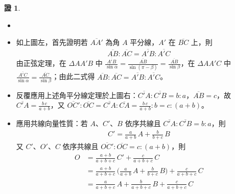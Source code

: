 \documentclass[14pt]{extarticle}
\newcommand{\ds}{\displaystyle}
\theoremstyle{definition}
\newtheorem*{prf}{證}
\begin{document}
\begin{prf}
  \begin{itemize}
    \item[]
    \item 如上圖左，首先證明若 $\ds\overline{AA'}$ 為角 $A$ 平分線，$A'$ 在 $\overline{BC}$ 上，則
      \begin{align*}
        \overline{AB}:\overline{AC} = \overline{A'B}:\overline{A'C}
      \end{align*}
      由正弦定理，在 $\Delta AA'B$ 中 $\ds\frac{\overline{A'B}}{\sin\alpha} = \frac{\overline{AB}}{\sin(\pi - \beta)} = \frac{\overline{AB}}{\sin\beta}$，在 $\Delta AA'C$ 中 $\ds\frac{\overline{A'C}}{\sin\alpha} = \frac{\overline{AC}}{\sin\beta}$；由此二式得 $\overline{AB}:\overline{AC} = \overline{A'B}:\overline{A'C}$。
    \item 反覆應用上述角平分線定理於上圖右：$\ds\overline{C'A}:\overline{C'B} = b:a$，$\ds\overline{AB} = c$，故 $\ds\overline{C'A} = \frac{b\,c}{a + b}$，又 $\ds\overline{OC'}:\overline{OC} = \overline{C'A}:\overline{CA} = \frac{b\,c}{a + b}:b = c:(a + b)$。
    \item 應用共線向量性質：若 $A$、$C'$、$B$ 依序共線且 $\overline{C'A}:\overline{C'B} = b:a$，則
      \begin{align*}
        C' = \frac{a}{a + b}\,A + \frac{b}{b + c}\,B
      \end{align*}
      又 $C'$、$O'$、$C$ 依序共線且 $\overline{OC'}:\overline{OC} = c:(a + b)$，則
      \begin{align*}
        O &= \frac{a + b}{a + b + c}\,C' + \frac{c}{a + b + c}\,C \\ 
          &= \frac{a + b}{a + b + c}\,\bigg(\frac{a}{a + b}\,A + \frac{b}{b + c}\,B\bigg) + \frac{c}{a + b + c}\,C \\ 
          &= \frac{a}{a + b + c}\,A + \frac{b}{a + b + c}\,B + \frac{c}{a + b + c}\,C
      \end{align*}
  \end{itemize}
\end{prf}
\end{document}
